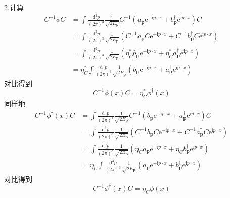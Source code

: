 2.计算
\begin{equation}
    \begin{aligned}
        C^{-1}\phi C&=\int{\frac{\mathrm{d}^3p}{\left( 2\pi \right) ^3}}\frac{1}{\sqrt{2E_{\mathbf{p}}}}C^{-1}\left( a_{\mathbf{p}}\mathrm{e}^{-\mathrm{i}p\cdot x}+b_{\mathbf{p}}^{\dagger}\mathrm{e}^{\mathrm{i}p\cdot x} \right) C
\\
&=\int{\frac{\mathrm{d}^3p}{\left( 2\pi \right) ^3}}\frac{1}{\sqrt{2E_{\mathbf{p}}}}\left( C^{-1}a_{\mathbf{p}}C\mathrm{e}^{-\mathrm{i}p\cdot x}+C^{-1}b_{\mathbf{p}}^{\dagger}C\mathrm{e}^{\mathrm{i}p\cdot x} \right) 
\\
&=\int{\frac{\mathrm{d}^3p}{\left( 2\pi \right) ^3}}\frac{1}{\sqrt{2E_{\mathbf{p}}}}\left( \eta _{C}^{*}b_{\mathbf{p}}\mathrm{e}^{-\mathrm{i}p\cdot x}+\eta _{C}^{*}a_{\mathbf{p}}^{\dagger}\mathrm{e}^{\mathrm{i}p\cdot x} \right) 
\\
&=\eta _{C}^{*}\int{\frac{\mathrm{d}^3p}{\left( 2\pi \right) ^3}}\frac{1}{\sqrt{2E_{\mathbf{p}}}}\left( b_{\mathbf{p}}\mathrm{e}^{-\mathrm{i}p\cdot x}+a_{\mathbf{p}}^{\dagger}\mathrm{e}^{\mathrm{i}p\cdot x} \right) 
    \end{aligned}
\end{equation}
对比得到
\begin{equation}
    C^{-1}\phi (x)C=\eta _{C}^{*}\phi ^{\dagger}(x)
\end{equation}
同样地
\begin{equation}
    \begin{aligned}
        C^{-1}\phi ^{\dagger}(x)C&=\int{\frac{\mathrm{d}^3p}{\left( 2\pi \right) ^3}}\frac{1}{\sqrt{2E_{\mathbf{p}}}}C^{-1}\left( b_{\mathbf{p}}\mathrm{e}^{-\mathrm{i}p\cdot x}+a_{\mathbf{p}}^{\dagger}\mathrm{e}^{\mathrm{i}p\cdot x} \right) C
\\
&=\int{\frac{\mathrm{d}^3p}{\left( 2\pi \right) ^3}}\frac{1}{\sqrt{2E_{\mathbf{p}}}}\left( C^{-1}b_{\mathbf{p}}C\mathrm{e}^{-\mathrm{i}p\cdot x}+C^{-1}a_{\mathbf{p}}^{\dagger}C\mathrm{e}^{\mathrm{i}p\cdot x} \right) 
\\
&=\int{\frac{\mathrm{d}^3p}{\left( 2\pi \right) ^3}}\frac{1}{\sqrt{2E_{\mathbf{p}}}}\left( \eta _Ca_{\mathbf{p}}\mathrm{e}^{-\mathrm{i}p\cdot x}+\eta _Cb_{\mathbf{p}}^{\dagger}\mathrm{e}^{\mathrm{i}p\cdot x} \right) 
\\
&=\eta _C\int{\frac{\mathrm{d}^3p}{\left( 2\pi \right) ^3}}\frac{1}{\sqrt{2E_{\mathbf{p}}}}\left( a_{\mathbf{p}}\mathrm{e}^{-\mathrm{i}p\cdot x}+b_{\mathbf{p}}^{\dagger}\mathrm{e}^{\mathrm{i}p\cdot x} \right) 
    \end{aligned}
\end{equation}
对比得到
\begin{equation}
    C^{-1}\phi ^{\dagger}(x)C=\eta _C\phi (x)
\end{equation}
